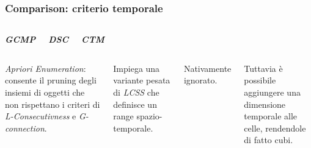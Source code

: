 \documentclass{beamer}
\begin{document}
\begin{frame}
	\frametitle{Comparison: criterio temporale}
	\begin{columns}
		
		\begin{center}
			\textbf{\textit{\huge{GCMP}}}
			
		\end{center}
		
		\begin{center}
			\textbf{\textit{\huge{DSC}}}
			
		\end{center}
		
		\begin{center}
			\textbf{\textit{\huge{CTM}}}
			
		\end{center}
	\end{columns}
	\begin{columns}
		
		\column{.3\columnwidth}
		
		\textit{Apriori Enumeration}: consente il pruning degli insiemi di oggetti
		che non rispettano i criteri di \textit{L-Consecutivness} e \textit{G-connection}.
		
		
		\column{.3\textwidth}
		
		Impiega una variante pesata di \textit{LCSS} che definisce un range spazio-temporale.
		
		\column{.3\textwidth}
		Nativamente ignorato.
		
		Tuttavia è possibile aggiungere una dimensione temporale alle celle, rendendole di fatto cubi.
		
	\end{columns}
\end{frame}    
\end{document}
